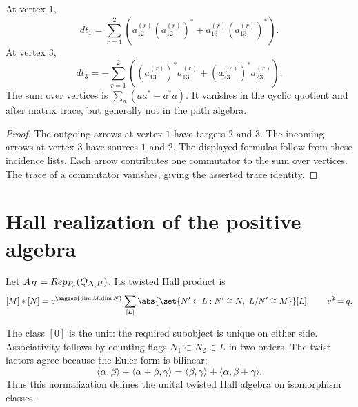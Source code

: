 \begin{calculation}
At vertex $1$,
\[
 d t_1=
 \sum_{r=1}^2
 \left(
 a_{12}^{(r)}(a_{12}^{(r)})^*
 +a_{13}^{(r)}(a_{13}^{(r)})^*
 \right).
\]
At vertex $3$,
\[
 d t_3=-\sum_{r=1}^2\left(
 (a_{13}^{(r)})^*a_{13}^{(r)}+
 (a_{23}^{(r)})^*a_{23}^{(r)}\right).
\]
The sum over vertices is $\sum_a(aa^*-a^*a)$.
It vanishes in the cyclic quotient and after matrix trace,
but generally not in the path algebra.
\end{calculation}
\begin{proof}
The outgoing arrows at vertex $1$ have targets $2$ and $3$.
The incoming arrows at vertex $3$ have sources $1$ and $2$.
The displayed formulas follow from these incidence lists.
Each arrow contributes one commutator to the sum over vertices.
The trace of a commutator vanishes, giving the asserted trace identity.
\end{proof}


\chapter{Hall realization of the positive algebra}
Let $A_H=Rep_{F_q}(Q_{\Delta,H})$.  Its twisted Hall product is
\[
 [M]*[N]
 =v^{\angles{\dim M,\dim N}}
 \sum_{[L]}
 \abs{\set{N'\subset L:N'\cong N,\ L/N'\cong M}}
 [L],
 \qquad v^2=q.
\]

The class $[0]$ is the unit: the required subobject is unique on either
side. Associativity follows by counting flags $N_1\subset N_2\subset L$
in two orders. The twist factors agree because the Euler form is
bilinear:
\[
 \langle\alpha,\beta\rangle+\langle\alpha+\beta,\gamma\rangle
 =\langle\beta,\gamma\rangle+\langle\alpha,\beta+\gamma\rangle.
\]
Thus this normalization defines the unital twisted Hall algebra on
isomorphism classes.

